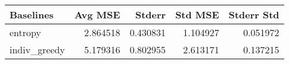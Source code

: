 \begin{tabular}{lrrrr}
\toprule
    Baselines &   Avg MSE &    Stderr &   Std MSE &  Stderr Std \\
\midrule
      entropy &  2.864518 &  0.430831 &  1.104927 &    0.051972 \\
 indiv\_greedy &  5.179316 &  0.802955 &  2.613171 &    0.137215 \\
\bottomrule
\end{tabular}
